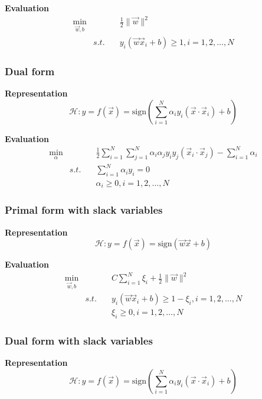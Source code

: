 \textbf{Evaluation}
\begin{eqnarray}
\min_{\vec{w},b}  && \frac{1}{2}\|\vec{w}\|^2 \\
       & s.t. \quad & y_i(\vec{w}\vec{x}_i+b)\geqslant 1, i=1,2, \dots , N
\end{eqnarray}


\subsubsection{Dual form}
\textbf{Representation}
\begin{equation}
\mathcal{H}:y=f(\vec{x})=\text{sign}\left(\sum\limits_{i=1}^N{\alpha_iy_i(\vec{x} \cdot \vec{x}_i)}+b\right)
\end{equation}

\textbf{Evaluation}
\begin{eqnarray}
 \min_{\alpha} && \frac{1}{2} \sum\limits_{i=1}^N\sum\limits_{j=1}^N \alpha_i\alpha_j y_i y_j (\vec{x}_i \cdot \vec{x}_j) - \sum\limits_{i=1}^N \alpha_i \\
               & s.t.  \quad &\sum\limits_{i=1}^N\alpha_i y_i=0 \\
               && \alpha_i \geqslant 0, i=1,2, \dots, N
\end{eqnarray}


\subsubsection{Primal form with slack variables}
\textbf{Representation}
\begin{equation}
\mathcal{H}:y=f(\vec{x})=\text{sign}(\vec{w}\vec{x}+b)
\end{equation}

\textbf{Evaluation}
\begin{eqnarray}
\min_{\vec{w},b}  &&  C \sum\limits_{i=1}^N\xi_i + \frac{1}{2}\|\vec{w}\|^2 \label{eqn:pfwr1} \\
      & s.t. \quad & y_i(\vec{w}\vec{x}_i+b)\geqslant 1-\xi_i, i=1,2, \dots , N \label{eqn:pfwr2} \\
                  && \xi_i \geqslant 0, i=1,2, \dots, N \label{eqn:pfwr3}
\end{eqnarray}


\subsubsection{Dual form with slack variables}
\textbf{Representation}
\begin{equation}
\mathcal{H}:y=f(\vec{x})=\text{sign}\left(\sum\limits_{i=1}^N{\alpha_iy_i(\vec{x} \cdot \vec{x}_i)}+b\right)
\end{equation}

